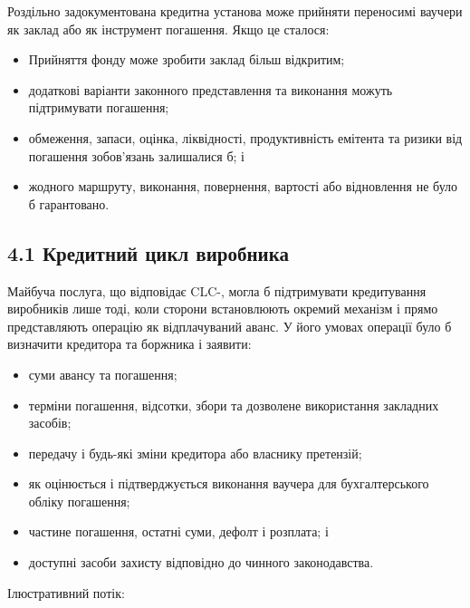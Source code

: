 \documentclass[11pt]{article}
\begin{document}
Роздільно задокументована кредитна установа може прийняти переносимі ваучери як заклад або як інструмент погашення. Якщо це сталося:

\begin{itemize}[leftmargin=*]
\item Прийняття фонду може зробити заклад більш відкритим;
\item додаткові варіанти законного представлення та виконання можуть підтримувати погашення;
\item обмеження, запаси, оцінка, ліквідності, продуктивність емітента та ризики від погашення зобов'язань залишалися б; і
\item жодного маршруту, виконання, повернення, вартості або відновлення не було б гарантовано.
\end{itemize}
\subsection*{4.1 Кредитний цикл виробника}

Майбуча послуга, що відповідає CLC-, могла б підтримувати кредитування виробників лише тоді, коли сторони встановлюють окремий механізм і прямо представляють операцію як відплачуваний аванс. У його умовах операції було б визначити кредитора та боржника і заявити:

\begin{itemize}[leftmargin=*]
\item суми авансу та погашення;
\item терміни погашення, відсотки, збори та дозволене використання закладних засобів;
\item передачу і будь-які зміни кредитора або власнику претензій;
\item як оцінюється і підтверджується виконання ваучера для бухгалтерського обліку погашення;
\item частине погашення, остатні суми, дефолт і розплата; і
\item доступні засоби захисту відповідно до чинного законодавства.
\end{itemize}
Ілюстративний потік:
\end{document}
